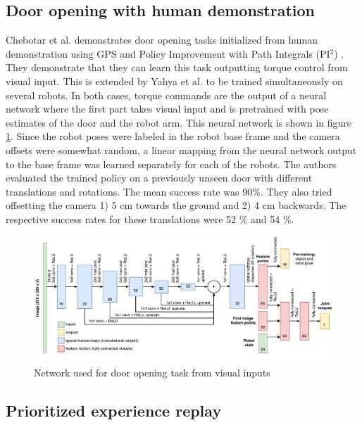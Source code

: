 \subsection{Door opening with human demonstration}

Chebotar et al. \cite{chebotar2016path} demonstrates door opening tasks
initialized from human demonstration using GPS and Policy Improvement with Path
Integrals (PI$^2$) \cite{theodorou2010generalized}. They demonstrate that they
can learn this task outputting torque control from visual input. This is
extended by Yahya et al. \cite{yahya2016collective} to be trained
simultaneously on several robots. In both cases, torque commands are the output
of a neural network where the first part takes visual input and is pretrained
with pose estimates of the door and the robot arm. This neural network is shown
in figure \ref{fig:gps_net}. Since the robot poses were labeled in the robot
base frame and the camera offsets were somewhat random, a linear mapping from
the neural network output to the base frame was learned separately for each of
the robots. The authors evaluated the trained policy on a previously unseen
door with different translations and rotations. The mean success rate was 90\%.
They also tried offsetting the camera 1) 5 cm towards the ground and 2) 4 cm
backwards. The respective success rates for these translations were 52 \% and
54 \%.

\begin{figure}[h]
    \centering
    \includegraphics[width = 1.0\textwidth]{res/gps-net.pdf}
    \caption{Network used for door opening task from visual inputs \cite{chebotar2016path}}
    \label{fig:gps_net}
\end{figure}

\subsection{Prioritized experience replay}
\label{sec:prio_sampling}

